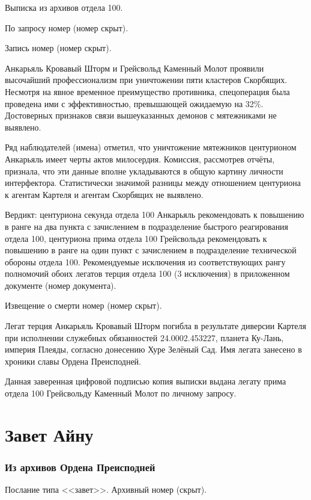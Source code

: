 \documentclass[a4paper,10pt]{book}
\begin{document}
Выписка из архивов отдела 100.

По запросу номер (номер скрыт).

Запись номер (номер скрыт).

Анкарьяль Кровавый Шторм и Грейсвольд Каменный Молот проявили высочайший 
профессионализм при уничтожении пяти кластеров Скорбящих. Несмотря на явное 
временное преимущество противника, спецоперация была проведена ими с 
эффективностью, превышающей ожидаемую на 32\%. Достоверных признаков связи 
вышеуказанных демонов с мятежниками не выявлено.

Ряд наблюдателей (имена) отметил, что уничтожение мятежников центурионом 
Анкарьяль имеет черты актов милосердия. Комиссия, рассмотрев отчёты, признала, 
что эти данные вполне укладываются в общую картину личности интерфектора. 
Статистически значимой разницы между отношением центуриона к агентам Картеля и 
агентам Скорбящих не выявлено.

Вердикт: центуриона секунда отдела 100 Анкарьяль рекомендовать к повышению в 
ранге на два пункта с зачислением в подразделение быстрого реагирования отдела 
100, центуриона прима отдела 100 Грейсвольда рекомендовать к повышению в ранге 
на один пункт с зачислением в подразделение технической обороны отдела 100. 
Рекомендуемые исключения из соответствующих рангу полномочий обоих легатов 
терция отдела 100 (3 исключения) в приложенном документе (номер документа).

Извещение о смерти номер (номер скрыт).

Легат терция Анкарьяль Кровавый Шторм погибла в результате диверсии Картеля при 
исполнении служебных обязанностей 24.0002.453227, планета Ку-Лань, империя 
Плеяды, согласно донесению Хуре Зелёный Сад. Имя легата занесено в хроники 
славы Ордена Преисподней.

Данная заверенная цифровой подписью копия выписки выдана легату прима отдела 
100 Грейсвольду Каменный Молот по личному запросу.

\section{Завет Айну}

\subsubsection{Из архивов Ордена Преисподней}

Послание типа <<завет>>. Архивный номер (скрыт).
\end{document}
